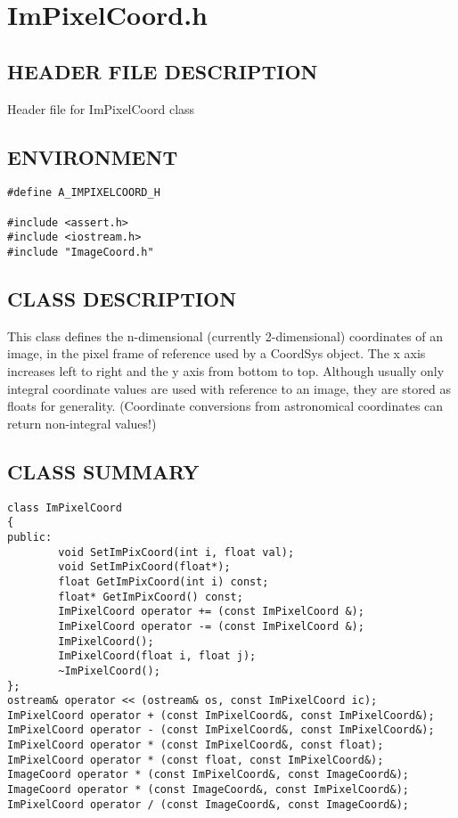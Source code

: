 \clearpage
\section{ImPixelCoord.h}

\subsection*{HEADER FILE DESCRIPTION}
 Header file for ImPixelCoord class
  
\subsection*{ENVIRONMENT}
\begin{verbatim}
#define A_IMPIXELCOORD_H

#include <assert.h>
#include <iostream.h>
#include "ImageCoord.h"
\end{verbatim}

\subsection*{CLASS DESCRIPTION}
          This class defines the n-dimensional (currently 2-dimensional)
   coordinates of an image, in the pixel frame of reference used by a
   CoordSys object. The x axis increases left to right and the y axis
   from bottom to top. Although usually only integral coordinate values
   are used with reference to an image, they are stored as floats for
   generality. (Coordinate conversions from astronomical coordinates can
   return non-integral values!) 

\subsection*{CLASS SUMMARY}
\begin{verbatim}
class ImPixelCoord
{
public:
        void SetImPixCoord(int i, float val);
        void SetImPixCoord(float*);
        float GetImPixCoord(int i) const;
        float* GetImPixCoord() const;
        ImPixelCoord operator += (const ImPixelCoord &);
        ImPixelCoord operator -= (const ImPixelCoord &);
        ImPixelCoord();
        ImPixelCoord(float i, float j);
        ~ImPixelCoord();
};
ostream& operator << (ostream& os, const ImPixelCoord ic);
ImPixelCoord operator + (const ImPixelCoord&, const ImPixelCoord&);
ImPixelCoord operator - (const ImPixelCoord&, const ImPixelCoord&);
ImPixelCoord operator * (const ImPixelCoord&, const float);
ImPixelCoord operator * (const float, const ImPixelCoord&);
ImageCoord operator * (const ImPixelCoord&, const ImageCoord&);
ImageCoord operator * (const ImageCoord&, const ImPixelCoord&);
ImPixelCoord operator / (const ImageCoord&, const ImageCoord&);
\end{verbatim}

